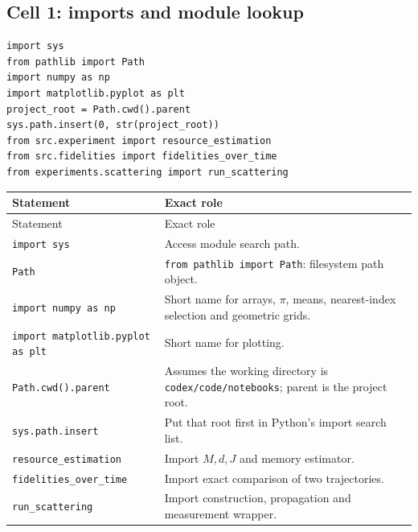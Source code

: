 \documentclass[11pt,a4paper]{article}
\newcommand{\code}[1]{\nolinkurl{#1}}
\begin{document}
\subsection{Cell 1: imports and module lookup}
\begin{lstlisting}
import sys
from pathlib import Path
import numpy as np
import matplotlib.pyplot as plt
project_root = Path.cwd().parent
sys.path.insert(0, str(project_root))
from src.experiment import resource_estimation
from src.fidelities import fidelities_over_time
from experiments.scattering import run_scattering
\end{lstlisting}
\begin{longtable}{p{}p{}}
\toprule Statement & Exact role\\\midrule\endfirsthead
\toprule Statement & Exact role\\\midrule\endhead
\code{import sys} & Access module search path.\\
\code{Path} & \code{from pathlib import Path}: filesystem path object.\\
\code{import numpy as np} & Short name for arrays, $\pi$, means, nearest-index selection and geometric grids.\\
\code{import matplotlib.pyplot as plt} & Short name for plotting.\\
\code{Path.cwd().parent} & Assumes the working directory is \code{codex/code/notebooks}; parent is the project root.\\
\code{sys.path.insert} & Put that root first in Python's import search list.\\
\code{resource_estimation} & Import $M,d,J$ and memory estimator.\\
\code{fidelities_over_time} & Import exact comparison of two trajectories.\\
\code{run_scattering} & Import construction, propagation and measurement wrapper.\\
\bottomrule
\end{longtable}
\end{document}
